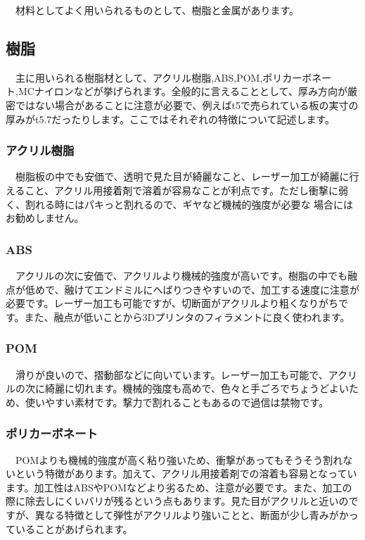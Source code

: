 \documentclass[onecolumn]{preport}
\begin{document}
　材料としてよく用いられるものとして、樹脂と金属があります。

\subsection{樹脂}

　主に用いられる樹脂材として、アクリル樹脂,ABS,POM,ポリカーボネート,MCナイロンなどが挙げられます。全般的に言えることとして、厚み方向が厳密ではない場合があることに注意が必要で、例えばt5で売られている板の実寸の厚みがt5.7だったりします。ここではそれぞれの特徴について記述します。

\subsubsection{アクリル樹脂}

　樹脂板の中でも安価で、透明で見た目が綺麗なこと、レーザー加工が綺麗に行えること、アクリル用接着剤で溶着が容易なことが利点です。ただし衝撃に弱く、割れる時にはパキっと割れるので、ギヤなど機械的強度が必要な
場合にはお勧めしません。

\subsubsection{ABS}

　アクリルの次に安価で、アクリルより機械的強度が高いです。樹脂の中でも融点が低めで、融けてエンドミルにへばりつきやすいので、加工する速度に注意が必要です。レーザー加工も可能ですが、切断面がアクリルより粗くなりがちです。また、融点が低いことから3Dプリンタのフィラメントに良く使われます。

\subsubsection{POM}

　滑りが良いので、摺動部などに向いています。レーザー加工も可能で、アクリルの次に綺麗に切れます。機械的強度も高めで、色々と手ごろでちょうどよいため、使いやすい素材です。撃力で割れることもあるので過信は禁物です。

\subsubsection{ポリカーボネート}

　POMよりも機械的強度が高く粘り強いため、衝撃があってもそうそう割れないという特徴があります。加えて、アクリル用接着剤での溶着も容易となっています。加工性はABSやPOMなどより劣るため、注意が必要です。また、加工の際に除去しにくいバリが残るという点もあります。見た目がアクリルと近いのですが、異なる特徴として弾性がアクリルより強いことと、断面が少し青みがかっていることがあげられます。
\end{document}
